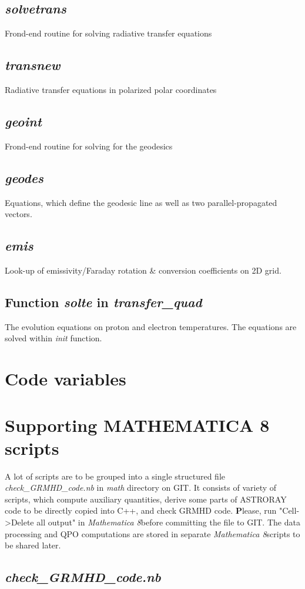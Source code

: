 \documentclass{emulateapj}
\newcommand{\mat}{\textit{Mathematica 8}}
\begin{document}
\subsection{\textit{solvetrans}}
Frond-end routine for solving radiative transfer equations
\subsection{\textit{transnew}}
Radiative transfer equations in polarized polar coordinates
\subsection{\textit{geoint}}
Frond-end routine for solving for the geodesics
\subsection{\textit{geodes}}
Equations, which define the geodesic line as well as two parallel-propagated vectors.
\subsection{\textit{emis}}
Look-up of emissivity/Faraday rotation \& conversion coefficients on 2D grid.
\subsection{Function \textit{solte} in \textit{transfer\_quad}}
The evolution equations on proton and electron temperatures. The equations are solved within \textit{init} function.

\section{Code variables}


\section{Supporting MATHEMATICA 8 scripts}
A lot of scripts are to be grouped into a single structured file \textit{check\_GRMHD\_code.nb} in \textit{math} directory on GIT.
It consists of variety of scripts, which compute auxiliary quantities, derive some parts of ASTRORAY code to be directly copied into C++, and check GRMHD code.
{\textbf Please, run "Cell->Delete all output" in \mat before committing the file to GIT.}
The data processing and QPO computations are stored in separate \mat scripts to be shared later.
\subsection{\textit{check\_GRMHD\_code.nb}}
\end{document}
